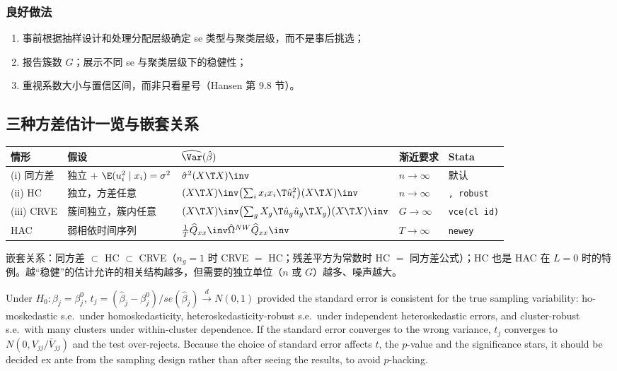 \subsubsection{良好做法}

\begin{enumerate}
\item 事前根据抽样设计和处理分配层级确定 se 类型与聚类层级，而不是事后挑选；
\item 报告簇数 $G$；展示不同 se 与聚类层级下的稳健性；
\item 重视系数大小与置信区间，而非只看星号（Hansen 第 9.8 节）。
\end{enumerate}

\subsection{三种方差估计一览与嵌套关系}

\begin{center}
\small
\begin{tabularx}{\linewidth}{>{\raggedright\arraybackslash}p{1.6cm}>{\raggedright\arraybackslash}p{2.5cm}>{\raggedright\arraybackslash}p{5.2cm}>{\raggedright\arraybackslash}p{1.3cm}L}
\toprule
情形 & 假设 & $\widehat\Var(\hat\beta)$ & 渐近要求 & Stata\\
\midrule
(i) 同方差 & 独立 + $\E(u_i^2\mid x_i)=\sigma^2$ & $\hat\sigma^2(X\T X)\inv$ & $n\to\infty$ & 默认\\
(ii) HC & 独立，方差任意 & $(X\T X)\inv\bigl(\sum_ix_ix_i\T\hat u_i^2\bigr)(X\T X)\inv$ & $n\to\infty$ & \texttt{, robust}\\
(iii) CRVE & 簇间独立，簇内任意 & $(X\T X)\inv\bigl(\sum_gX_g\T\hat u_g\hat u_g\T X_g\bigr)(X\T X)\inv$ & $G\to\infty$ & \texttt{vce(cl id)}\\
HAC & 弱相依时间序列 & $\frac1T\widehat Q_{xx}\inv\hat\Omega^{NW}\widehat Q_{xx}\inv$ & $T\to\infty$ & \texttt{newey}\\
\bottomrule
\end{tabularx}
\label{tab:U05b-var}
\end{center}

嵌套关系：同方差 $\subset$ HC $\subset$ CRVE（$n_g=1$ 时 CRVE $=$ HC；残差平方为常数时 HC $=$ 同方差公式）；HC 也是 HAC 在 $L=0$ 时的特例。越“稳健”的估计允许的相关结构越多，但需要的独立单位（$n$ 或 $G$）越多、噪声越大。

\begin{english}
Under $H_0:\beta_j=\beta_j^0$, $t_j=(\hat\beta_j-\beta_j^0)/se(\hat\beta_j)\xrightarrow{d}N(0,1)$ provided the standard error is consistent for the true sampling variability: homoskedastic s.e.\ under homoskedasticity, heteroskedasticity-robust s.e.\ under independent heteroskedastic errors, and cluster-robust s.e.\ with many clusters under within-cluster dependence. If the standard error converges to the wrong variance, $t_j$ converges to $N(0,V_{jj}/\bar V_{jj})$ and the test over-rejects. Because the choice of standard error affects $t$, the $p$-value and the significance stars, it should be decided ex ante from the sampling design rather than after seeing the results, to avoid $p$-hacking.
\end{english}

